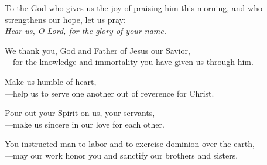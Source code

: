 \intercessions

\begin{raggedright}
To the God who gives us the joy of praising him this morning, and who strengthens our hope, let us pray:\\
\emph{Hear us, O Lord, for the glory of your name.}

\medskip
We thank you, God and Father of Jesus our Savior,\\
{\color{red}---}for the knowledge and immortality you have given us through him.

\medskip
Make us humble of heart,\\
{\color{red}---}help us to serve one another out of reverence for Christ.

\medskip
Pour out your Spirit on us, your servants,\\
{\color{red}---}make us sincere in our love for each other.

\medskip
You instructed man to labor and to exercise dominion over the earth,\\
{\color{red}---}may our work honor you and sanctify our brothers and sisters.
\end{raggedright}